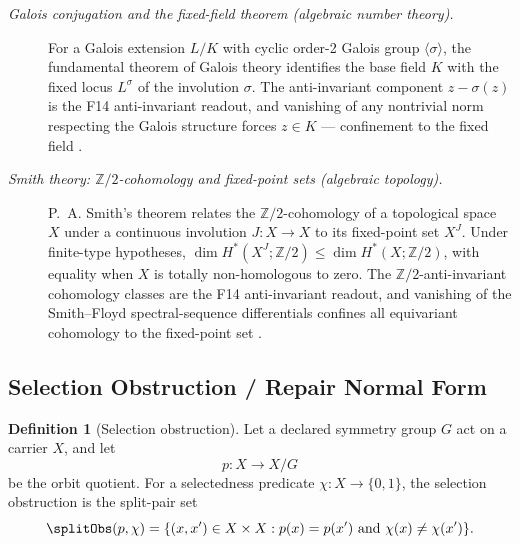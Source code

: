 \documentclass[11pt]{article}
\theoremstyle{definition}
\newtheorem{definition}[theorem]{Definition}
\begin{document}
\begin{description}
\item[\emph{Galois conjugation and the fixed-field theorem
(algebraic number theory).}]
For a Galois extension \(L/K\) with cyclic order-2 Galois group
\(\langle\sigma\rangle\), the fundamental theorem of Galois theory
identifies the base field \(K\) with the fixed locus \(L^{\sigma}\)
of the involution \(\sigma\).  The anti-invariant component
\(z-\sigma(z)\) is the F14 anti-invariant readout, and vanishing
of any nontrivial norm respecting the Galois structure forces
\(z\in K\) --- confinement to the fixed field
\citep{Galois1846Memoire}.

\item[\emph{Smith theory: \(\mathbb Z/2\)-cohomology and
fixed-point sets (algebraic topology).}]
P.~A. Smith's theorem relates the
\(\mathbb Z/2\)-cohomology of a topological space \(X\) under a
continuous involution \(J:X\to X\) to its fixed-point set
\(X^J\).  Under finite-type hypotheses,
\(\dim H^*(X^J;\mathbb Z/2)\le\dim H^*(X;\mathbb Z/2)\), with
equality when \(X\) is totally non-homologous to zero.  The
\(\mathbb Z/2\)-anti-invariant cohomology classes are the F14
anti-invariant readout, and vanishing of the
Smith--Floyd spectral-sequence differentials confines all
equivariant cohomology to the fixed-point set
\citep{Smith1938TransformationsFinitePeriod}.
\end{description}

\subsection{Selection Obstruction / Repair Normal Form}\label{sec:symmetry:selection-obstruction}

\begin{definition}[Selection obstruction]\label{def:selection-obstruction}
Let a declared symmetry group \(G\) act on a carrier \(X\), and let
\[
  p:X\to X/G
\]
be the orbit quotient.  For a selectedness predicate
\(\chi:X\to\{0,1\}\), the selection obstruction is the split-pair set
\[
  \splitObs(p,\chi)
  =
  \{(x,x')\in X\times X:
      p(x)=p(x')\ \text{and}\ \chi(x)\ne\chi(x')\}.
\]
\end{definition}
\end{document}
